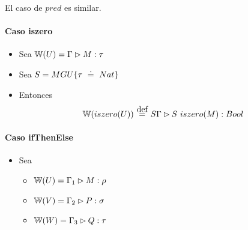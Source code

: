 El caso de $pred$ es similar.

\paragraph{Caso iszero}

\begin{itemize}
  \item Sea $\mathbb{W}(U) = \Gamma \rhd M : \tau$
  \item Sea $S = MGU\{\tau \uni Nat\}$
  \item Entonces
  \[\w{iszero(U)} \eqdef S\Gamma \rhd S\ iszero(M) : Bool\]
\end{itemize}

\paragraph{Caso ifThenElse}

\begin{itemize}
  \item Sea
    \begin{itemize}
      \item $\mathbb{W}(U) = \Gamma_1 \rhd M : \rho$
      \item $\mathbb{W}(V) = \Gamma_2 \rhd P : \sigma$
      \item $\mathbb{W}(W) = \Gamma_3 \rhd Q : \tau$
    \end{itemize}
\end{itemize}

